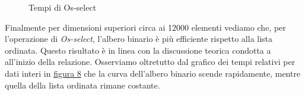 \documentclass[onecolumn]{article}
\begin{document}
\begin{figure}[H]
	\caption{Tempi di Os-select}
	\label{fig:os-select-l}
\end{figure}

Finalmente per dimensioni superiori circa ai 12000 elementi vediamo che, per l'operazione di \textit{Os-select}, l'albero binario è più efficiente rispetto alla lista ordinata. Questo risultato è in linea con la discussione teorica condotta a all'inizio della relazione. Osserviamo oltretutto dal grafico dei tempi relativi per dati interi in \hyperref[fig:os-select-l]{figura 8} che la curva dell'albero binario scende rapidamente, mentre quella della lista ordinata rimane costante. 
\end{document}
